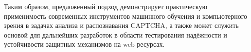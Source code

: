 Таким образом, предложенный подход демонстрирует практическую применимость 
современных инструментов машинного обучения и компьютерного зрения в задачах 
анализа и распознавания CAPTCHA, а также может служить основой для дальнейших 
разработок в области тестирования надёжности и устойчивости защитных механизмов 
на web-ресурсах.
